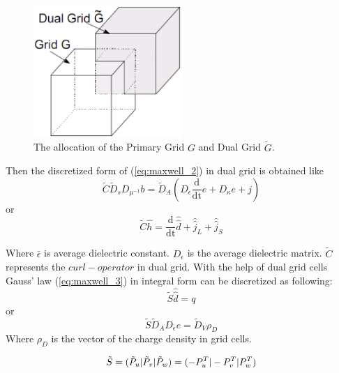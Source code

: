 \begin{figure}[!ht]
\centering
\includegraphics[width=0.5\textwidth]{bilder/dual_grid}
\caption{The allocation of the Primary Grid $G$ and Dual Grid $\tilde{G}$\cite{FIT_discrete_electrommagnetism}.}
\label{fig:dual_grid}
\end{figure}
Then the discretized form of (\ref{eq:maxwell_2}) in dual grid is obtained like
\begin{equation*}
\tilde{C}\tilde{D}_{s}D_{\mu^{-1}}b=\tilde{D}_{A}(D_{\epsilon}\frac{\mathrm{d}}{\mathrm{dt}}e+D_{\kappa}e+j)
\label{eq:ampere}
\end{equation*}
or
\begin{equation*}
\tilde{C}\widehat{h}=\frac{\mathrm{d}}{\mathrm{dt}}\widehat{\widehat{d}}+\widehat{\widehat{j}}_{L}+\widehat{\widehat{j}}_{S}
\label{eq:ampere_sample}
\end{equation*}

Where $\bar{\epsilon}$ is average dielectric constant. $ D_{\epsilon}$ is the average dielectric matrix. $\tilde{C}$ represents the $curl-operator$ in dual grid.
With the help of dual grid cells Gauss' law (\ref{eq:maxwell_3}) in integral form can be discretized\cite{script_FeldSim} as following:
\begin{equation*}
\tilde{S}\widehat{\widehat{d}}=q
\label{eq:gausslaw}
\end{equation*}
or
\begin{equation*}
\tilde{S}\tilde{D}_{A}D_{\epsilon}e=\tilde{D}_{V}\rho_{D}
\label{eq:gausslaw_sample}
\end{equation*}
Where $\rho_{D}$ is the vector of the charge density in grid cells.

\begin{equation*}
\tilde{S}=(\tilde{P}_{u}|\tilde{P}_{v}|\tilde{P}_{w})=(-P_{u}^{T}|-P_{v}^{T}|\-P_{w}^{T})
\label{eq:dual_S_matrix}
\end{equation*}
